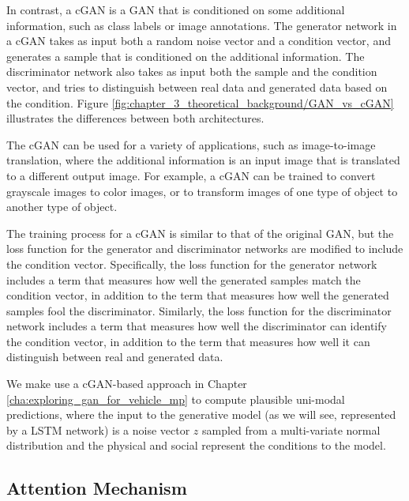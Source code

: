 In contrast, a cGAN is a GAN that is conditioned on some additional information, such as class labels or image annotations. The generator network in a cGAN takes as input both a random noise vector and a condition vector, and generates a sample that is conditioned on the additional information. The discriminator network also takes as input both the sample and the condition vector, and tries to distinguish between real data and generated data based on the condition. Figure \ref{fig:chapter_3_theoretical_background/GAN_vs_cGAN} illustrates the differences between both architectures.

The cGAN can be used for a variety of applications, such as image-to-image translation, where the additional information is an input image that is translated to a different output image. For example, a cGAN can be trained to convert grayscale images to color images, or to transform images of one type of object to another type of object.

The training process for a cGAN is similar to that of the original GAN, but the loss function for the generator and discriminator networks are modified to include the condition vector. Specifically, the loss function for the generator network includes a term that measures how well the generated samples match the condition vector, in addition to the term that measures how well the generated samples fool the discriminator. Similarly, the loss function for the discriminator network includes a term that measures how well the discriminator can identify the condition vector, in addition to the term that measures how well it can distinguish between real and generated data.

We make use a \ac{cGAN}-based approach in Chapter \ref{cha:exploring_gan_for_vehicle_mp} to compute plausible uni-modal predictions, where the input to the generative model (as we will see, represented by a \ac{LSTM} network) is a noise vector $z$ sampled from a multi-variate normal distribution and the physical and social represent the conditions to the model.


\subsection{Attention Mechanism}
\label{subsec:3_attention}

